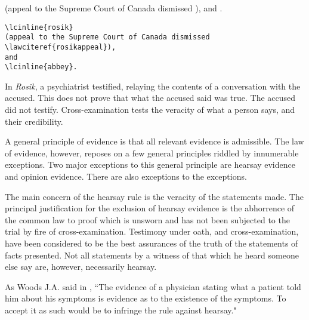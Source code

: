 (appeal to the Supreme Court of Canada dismissed 
),
and
.

\begin{magpar}
\begin{verbatim}
\lcinline{rosik}
(appeal to the Supreme Court of Canada dismissed 
\lawciteref{rosikappeal}),
and
\lcinline{abbey}.
\end{verbatim}
\end{magpar}
\begin{casenote}{}
In \textit{Rosik}, a psychiatrist testified, relaying the contents of a conversation with the accused. This does not prove that what the accused said was true. The accused did not testify. Cross-examination tests the veracity of what a person says, and their credibility. 
\end{casenote}
\begin{casequote}{}
A general principle of evidence is that all relevant evidence is admissible. The law of evidence, however, reposes on a few general principles riddled by innumerable exceptions. Two major exceptions to this general principle are hearsay evidence and opinion evidence. There are also exceptions to the exceptions. 
\end{casequote}


\begin{casequote}{}
The main concern of the hearsay rule is the veracity of the statements made. The principal justification for the exclusion of hearsay evidence is the abhorrence of the common law to proof which is unsworn and has not been subjected to the trial by fire of cross-examination. Testimony under oath, and cross-examination, have been considered to be the best assurances of the truth of the statements of facts presented. Not all statements by a witness of that which he heard someone else say are, however, necessarily hearsay.
\end{casequote}

\newpage
\begin{myquotation}\noindent
As Woods J.A. said in , ``The evidence of a physician stating what a patient told him about his symptoms is  evidence as to the existence of the symptoms. To accept it as such would be to infringe the rule against hearsay."
\end{myquotation}

